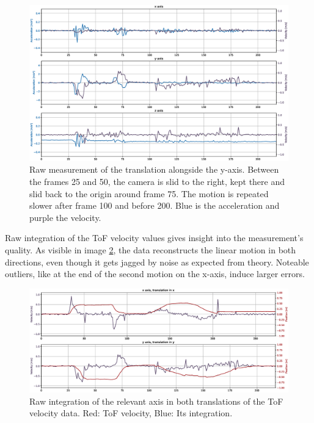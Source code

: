 \begin{figure}[H]
  \centering
  \includegraphics[width=1.0\textwidth]{images/tof_translation_measurement_y.eps}
  \caption{Raw measurement of the translation alongside the y-axis. Between the frames 25 and 50, the camera is slid to the right, kept there and slid back to the origin around frame 75. The motion is repeated slower after frame 100 and before 200. Blue is the acceleration and purple the velocity.}
  \label{im:tof_translation_measurement_y}
\end{figure}
Raw integration of the ToF velocity values gives insight into the measurement's quality. As visible in image \ref{im:tof_translation_measurement_integrated}, the data reconstructs the linear motion in both directions, even though it gets jagged by noise as expected from theory. Noteable outliers, like at the end of the second motion on the x-axis, induce larger errors. 
\begin{figure}[H]
  \centering
  \includegraphics[width=1.0\textwidth]{images/tof_translation_measurement_integrated.eps}
  \caption{Raw integration of the relevant axis in both translations of the ToF velocity data. Red: ToF velocity, Blue: Its integration.}
  \label{im:tof_translation_measurement_integrated}
\end{figure} 
